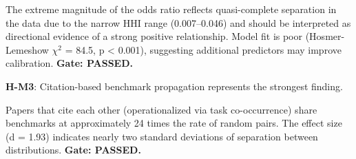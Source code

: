 \begin{table}[htbp]
\centering
{}
\end{table}

The extreme magnitude of the odds ratio reflects quasi-complete separation in the data due to the narrow HHI range (0.007--0.046) and should be interpreted as directional evidence of a strong positive relationship. Model fit is poor (Hosmer-Lemeshow $\chi^2$ = 84.5, p < 0.001), suggesting additional predictors may improve calibration. \textbf{Gate: PASSED.}

\textbf{H-M3}: Citation-based benchmark propagation represents the strongest finding.

\begin{table}[htbp]
\centering
{}
\end{table}

\begin{table}[htbp]
\centering
{}
\end{table}

Papers that cite each other (operationalized via task co-occurrence) share benchmarks at approximately 24 times the rate of random pairs. The effect size (d = 1.93) indicates nearly two standard deviations of separation between distributions. \textbf{Gate: PASSED.}

